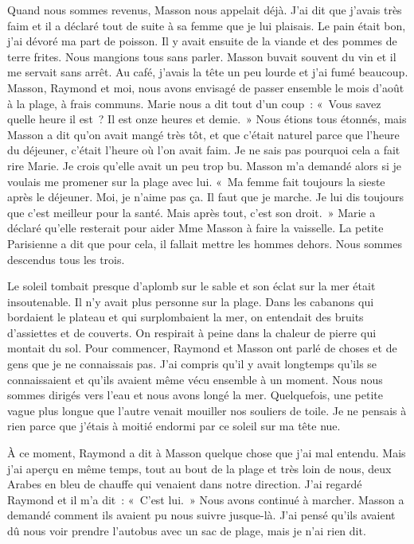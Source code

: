 \documentclass[french,twoside]{book} %
\begin{document}
Quand nous sommes revenus, Masson nous appelait déjà. J'ai dit que j’avais très faim et il a déclaré tout de suite à sa femme que je lui plaisais. Le pain était bon, j’ai dévoré ma part de poisson. Il y avait ensuite de la viande et des pommes de terre frites. Nous mangions tous sans parler. Masson buvait souvent du vin et il me servait sans arrêt. Au café, j’avais la tête un peu lourde et j’ai fumé beaucoup. Masson, Raymond et moi, nous avons envisagé de passer ensemble le mois d’août à la plage, à frais communs. Marie nous a dit tout d’un coup : « Vous savez quelle heure il est ? Il est onze heures et demie. » Nous étions tous étonnés, mais Masson a dit qu’on avait mangé très tôt, et que c’était naturel parce que l’heure du déjeuner, c’était l’heure où l’on avait faim. Je ne sais pas pourquoi cela a fait rire Marie. Je crois qu’elle avait un peu trop bu. Masson m’a demandé alors si je voulais me promener sur la plage avec lui. « Ma femme fait toujours la sieste après le déjeuner. Moi, je n’aime pas ça. Il faut que je marche. Je lui dis toujours que c’est meilleur pour la santé. Mais après tout, c’est son droit. » Marie a déclaré qu’elle resterait pour aider Mme Masson à faire la vaisselle. La petite Parisienne a dit que pour cela, il fallait mettre les hommes dehors. Nous sommes descendus tous les trois.\par
Le soleil tombait presque d’aplomb sur le sable et son éclat sur la mer était insoutenable. Il n’y avait plus personne sur la plage. Dans les cabanons qui bordaient le plateau et qui surplombaient la mer, on entendait des bruits d’assiettes et de couverts. On respirait à peine dans la chaleur de pierre qui montait du sol. Pour commencer, Raymond et Masson ont parlé de choses et de gens que je ne connaissais pas. J'ai compris qu’il y avait longtemps qu’ils se connaissaient et qu’ils avaient même vécu ensemble à un moment. Nous nous sommes dirigés vers l’eau et nous avons longé la mer. Quelquefois, une petite vague plus longue que l’autre venait mouiller nos souliers de toile. Je ne pensais à rien parce que j’étais à moitié endormi par ce soleil sur ma tête nue.\par
À ce moment, Raymond a dit à Masson quelque chose que j’ai mal entendu. Mais j’ai aperçu en même temps, tout au bout de la plage et très loin de nous, deux Arabes en bleu de chauffe qui venaient dans notre direction. J'ai regardé Raymond et il m’a dit : « C'est lui. » Nous avons continué à marcher. Masson a demandé comment ils avaient pu nous suivre jusque-là. J'ai pensé qu’ils avaient dû nous voir prendre l’autobus avec un sac de plage, mais je n’ai rien dit.\par
\end{document}
